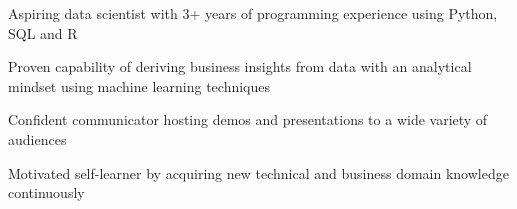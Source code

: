 

\begin{cventries}

    

  \cvabout
    {
      \begin{cvitems} %
        \item{Aspiring data scientist with 3+ years of programming experience using Python, SQL and R}
        \item{Proven capability of deriving business insights from data with an analytical mindset using machine learning techniques}
        \item{Confident communicator hosting demos and presentations to a wide variety of audiences}
        \item{Motivated self-learner by acquiring new technical and business domain knowledge continuously}
      \end{cvitems}
    }
    
\end{cventries}



    

